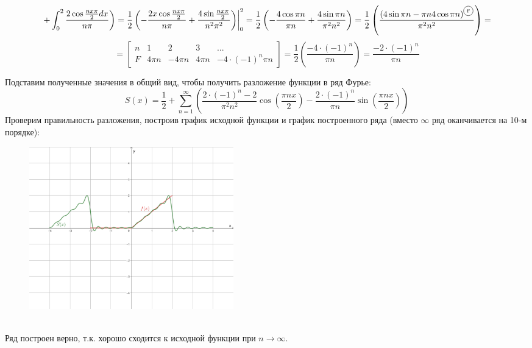 \documentclass{article}
\newcommand*\circled[1]{\tikz[baseline= (char.base)]{
            \node[shape=circle,draw,inner sep=2pt] (char) {#1};}}
\newcommand{\at}{\biggr\rvert}
\begin{document}
$$\left. +\int_{0}^{2}\frac{2\cos\frac{nx\pi}{2}dx}{n\pi}\right) = \frac{1}{2}\left(-\frac{2x\cos\frac{nx\pi}{2}}{n\pi}+\frac{4\sin\frac{nx\pi}{2}}{n^2\pi^2}\right)\at^{2}_{0} =
\frac{1}{2}\left(-\frac{4\cos\pi n}{\pi n}+\frac{4\sin\pi n}{\pi^2n^2}\right) =
\frac{1}{2}\left(\frac{(4\sin\pi n - \pi n4\cos\pi n)^{\circled{{\tiny F}}}}{\pi^2n^2}\right) =$$
$$= \left[\begin{array}{l|c|c|c|c}
n & 1 & 2 & 3 & ... \\
\hline
F & 4\pi n & -4\pi n & 4\pi n & -4\cdot(-1)^n\pi n
\end{array}\right] = \frac{1}{2}\left(\frac{-4\cdot(-1)^n}{\pi n}\right) = \frac{-2\cdot(-1)^n}{\pi n}$$ \pagebreak

\noindent Подставим полученные значения в общий вид, чтобы получить разложение функции в ряд Фурье:
$$S(x) = \frac{1}{2} + \sum_{n=1}^{\infty}\left(\frac{2 \cdot (-1)^n - 2}{\pi^2n^2}\cos\left(\frac{\pi nx}{2}\right)-\frac{2\cdot(-1)^n}{\pi n}\sin\left(\frac{\pi nx}{2}\right)\right)$$
Проверим правильность разложения, построив график исходной функции и график построенного ряда (вместо $\infty$ ряд оканчивается на 10-м порядке):
\begin{figure}[!h]
\centering
\includegraphics[width=0.43\textwidth]{graph}
\end{figure} \\
Ряд построен верно, т.к. хорошо сходится к исходной функции при $n \rightarrow \infty$.
\end{document}
